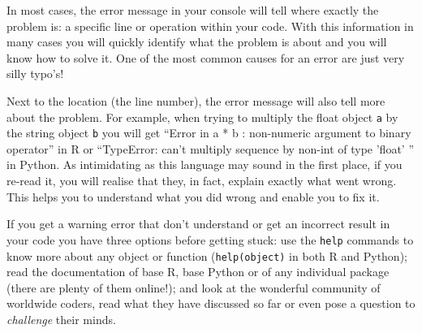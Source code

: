 In most cases, the error message in your console will tell where exactly the problem is: a specific line or operation within your code. With this information in many cases you will quickly identify what the problem is about and you will know how to solve it. One of the most common causes for an error are just very silly typo's!

Next to the location (the line number), the error message will also tell more about the problem. For example, when trying to multiply the float object \texttt{a} by the string object \texttt{b} you will get ``Error in a * b : non-numeric argument to binary operator'' in R or ``TypeError: can't multiply sequence by non-int of type 'float' '' in Python. As intimidating as this language may sound in the first place, if you re-read it, you will realise that they, in fact, explain exactly what went wrong. This helps you to understand what you did wrong and enable you to fix it. 




If you get a warning error that don't understand or get an incorrect result in your code you have three options before getting stuck: use the \texttt{help} commands to know more about any object or function (\verb|help(object)| in both R and  Python); read the documentation of base R, base Python or of any individual package (there are plenty of them online!); and look at the wonderful community of worldwide coders, read what they have discussed so far or even pose a question to \textit{challenge} their minds.

